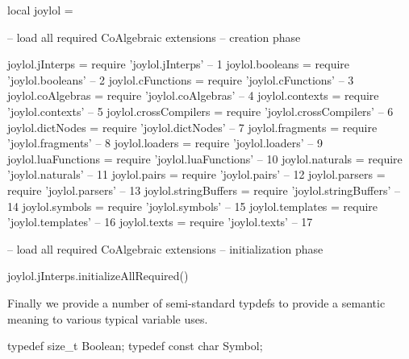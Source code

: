 \startLuaCode
local joylol = { }

-- load all required CoAlgebraic extensions -- creation phase

joylol.jInterps       = require 'joylol.jInterps'       --  1
joylol.booleans       = require 'joylol.booleans'       --  2
joylol.cFunctions     = require 'joylol.cFunctions'     --  3
joylol.coAlgebras     = require 'joylol.coAlgebras'     --  4
joylol.contexts       = require 'joylol.contexts'       --  5
joylol.crossCompilers = require 'joylol.crossCompilers' --  6
joylol.dictNodes      = require 'joylol.dictNodes'      --  7
joylol.fragments      = require 'joylol.fragments'      --  8
joylol.loaders        = require 'joylol.loaders'        --  9
joylol.luaFunctions   = require 'joylol.luaFunctions'   -- 10
joylol.naturals       = require 'joylol.naturals'       -- 11
joylol.pairs          = require 'joylol.pairs'          -- 12
joylol.parsers        = require 'joylol.parsers'        -- 13
joylol.stringBuffers  = require 'joylol.stringBuffers'  -- 14
joylol.symbols        = require 'joylol.symbols'        -- 15
joylol.templates      = require 'joylol.templates'      -- 16
joylol.texts          = require 'joylol.texts'          -- 17

-- load all required CoAlgebraic extensions -- initialization phase

joylol.jInterps.initializeAllRequired()

\stopLuaCode

Finally we provide a number of semi-standard typdefs to provide a semantic 
meaning to various typical variable uses. 

\startCHeader
typedef size_t     Boolean;
typedef const char Symbol;
\stopCHeader
